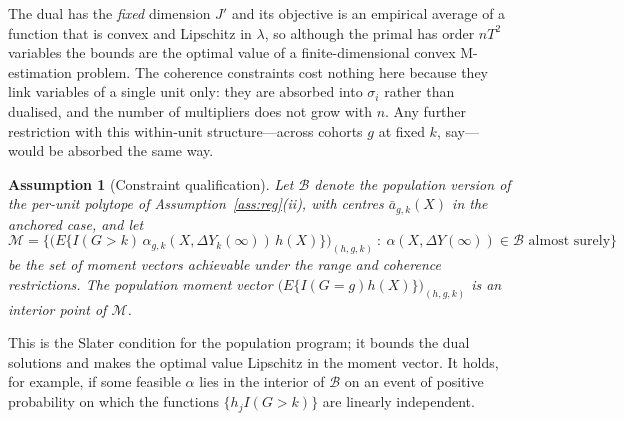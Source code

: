 \documentclass[12pt]{article}
\newtheorem{assumption}{Assumption}
\theoremstyle{remark}
\begin{document}
The dual has the \emph{fixed} dimension $J'$ and its objective is an empirical average of
a function that is convex and Lipschitz in $\lambda$, so although the primal has order
$nT^2$ variables the bounds are the optimal value of a finite-dimensional convex
M-estimation problem. The coherence constraints cost nothing here because they link
variables of a single unit only: they are absorbed into $\sigma_i$ rather than dualised,
and the number of multipliers does not grow with $n$. Any further restriction with this
within-unit structure---across cohorts $g$ at fixed $k$, say---would be absorbed the same
way.

\begin{assumption}[Constraint qualification]
\label{ass:slater}
Let $\mathcal{B}$ denote the population version of the per-unit polytope of
Assumption~\ref{ass:reg}(ii), with centres $\bar a_{g,k}(X)$ in the anchored case, and let
\[
\mathcal{M} = \Big\{ \big( E\{ I(G{>}k)\,\alpha_{g,k}(X, \Delta Y_k(\infty))\, h(X) \} \big)_{(h,g,k)}
 \ :\ \alpha(X, \Delta Y(\infty)) \in \mathcal{B} \text{ almost surely} \Big\}
\]
be the set of moment vectors achievable under the range and coherence restrictions. The
population moment vector $\big( E\{I(G{=}g)h(X)\} \big)_{(h,g,k)}$ is an interior point of
$\mathcal{M}$.
\end{assumption}

This is the Slater condition for the population program; it bounds the dual solutions and
makes the optimal value Lipschitz in the moment vector. It holds, for example, if some
feasible $\alpha$ lies in the interior of $\mathcal{B}$ on an event of positive
probability on which the functions $\{h_j I(G{>}k)\}$ are linearly independent.
\end{document}

